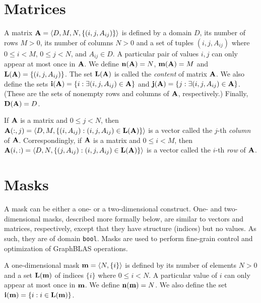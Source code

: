 \section{Matrices}
\label{Sec:Matrices}

A matrix ${\bf A} = \langle D, M, N, \{ (i,j,A_{ij}) \} \rangle$ is
defined by a domain $D$, its number of rows $M>0$, its number of columns
$N>0$ and a set of tuples $(i,j,A_{ij})$ where $0 \leq i < M$, $0 \leq
j < N$, and $A_{ij} \in D$. A particular pair of values $i,j$ can only
appear at most once in ${\bf A}$. We define $\bold{n}({\bf A})
= N$,  $\bold{m}({\bf A}) = M$ and $\bold{L}({\bf A}) = \{
(i,j,A_{ij}) \}$.  
The set $\bold{L}({\bf A})$ is called the \emph{content} of matrix ${\bf A}$.
We also define the sets ${\bf i({\bf A})} = \{
i : \exists (i,j,A_{ij}) \in {\bf A} \}$ and ${\bf j({\bf A})}
= \{ j : \exists (i,j,A_{ij}) \in {\bf A} \}$.  (These are the sets
of nonempty rows and columns of ${\bf A}$, respectively.)  Finally,
$\bold{D}({\bf A}) = D$.

If ${\bf A}$ is a matrix and $0 \leq j < N$, then ${\bf A}(:,j)
= \langle D, M, \{(i,A_{ij}) : (i,j,A_{ij}) \in \bold{L}({\bf A})
\} \rangle$ is a vector called the $j$-th \emph{column}
of ${\bf A}$. Correspondingly, if ${\bf A}$ is a matrix and
$0 \leq i < M$, then ${\bf A}(i,:) = \langle D, N, \{(j,A_{ij}) :
(i,j,A_{ij}) \in \bold{L}({\bf A}) \} \rangle$ is a vector called
the $i$-th \emph{row} of ${\bf A}$.

\section{Masks}
\label{Sec:Masks}

A mask can be either a one- or a two-dimensional construct.
One- and two-dimensional masks, described more formally below, are
similar to vectors and matrices, respectively, except that they have
structure (indices) but no values. As such, they are of domain {\tt bool}. Masks are used to perform fine-grain control and optimization of GraphBLAS operations.

A one-dimensional mask ${\bf m} = \langle N, \{ i \} \rangle$
is defined by its number of elements $N>0$ and a set $\bold{L}({\bf m})$ of indices $\{ i \}$ 
where $0 \leq i < N$.  A particular value of $i$ can only
appear at most once in ${\bf m}$. We define $\bold{n}({\bf m}) = N$. 
We also define the set
${\bf i({\bf m})} = \{ i : i \in \bold{L}({\bf m}) \}$.

